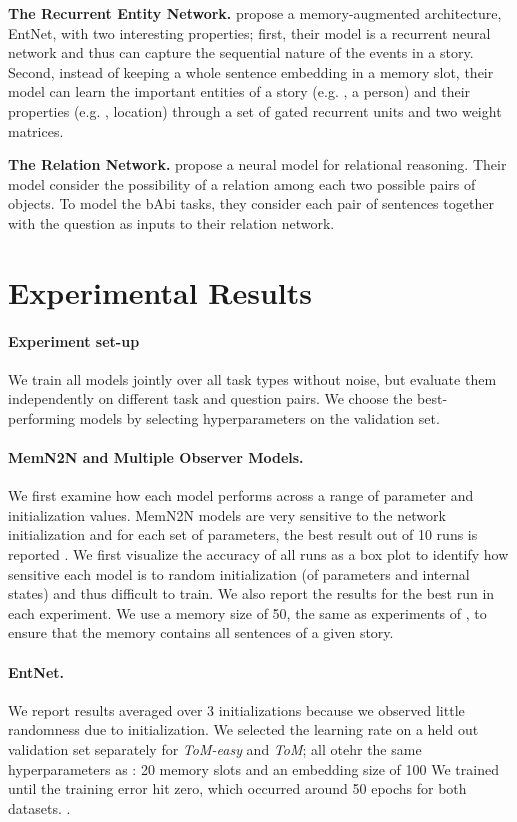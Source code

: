 \textbf{The Recurrent Entity Network.}
\citet{henaff2016tracking} propose a memory-augmented architecture, EntNet, with two interesting properties; first, their model is a recurrent neural network and thus can capture the sequential nature of the events in a story. Second, instead of keeping a whole sentence embedding in a memory slot, their model can learn the important entities of a story (e.g. , a person) and their properties (e.g. , location) through a set of gated recurrent units and two weight matrices. 

\textbf{The Relation Network.} \citet{santoro.etal.2017} propose a neural model for relational reasoning. Their model consider the possibility of a relation among each two possible pairs of objects. To model the bAbi tasks, they consider each pair of sentences together with the question as inputs to their relation network.

\section{Experimental Results}

\paragraph{Experiment set-up}

We train all models jointly over all task types without noise, but evaluate them independently on different task and question pairs. We choose the best-performing models by selecting hyperparameters on the validation set.

\paragraph{MemN2N and Multiple Observer Models.} We first examine how each model performs across a range of parameter and initialization values. MemN2N models are very sensitive to the network initialization and for each set of parameters, the best result out of 10 runs is reported \citep{sukhbaatar2015end}. We first visualize the accuracy of all runs as a box plot to identify how sensitive each model is to random initialization (of parameters and internal states) and thus difficult to train. We also report the results for the best run in each experiment. We use a memory size of 50, the same as experiments of \citet{sukhbaatar2015end}, to ensure that the memory contains all sentences of a given story.

\paragraph{EntNet.} We report results averaged over 3 initializations because we observed little randomness due to initialization. We selected the learning rate on a held out validation set separately for \textit{ToM-easy} and \textit{ToM}; all otehr the same hyperparameters as \citet{henaff2016tracking}: 20 memory slots and an embedding size of 100 We trained until the training error hit zero, which occurred around 50 epochs for both datasets. . 

